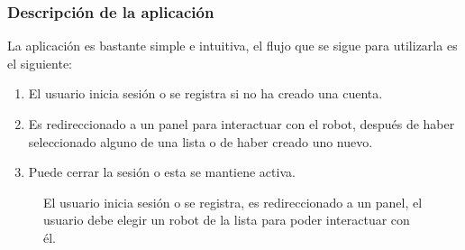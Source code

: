 %
%
%
%
%
%
%
%

\subsubsection{Descripción de la aplicación}
\label{\detokenize{descripcion-de-la-aplicacion}}

La aplicación es bastante simple e intuitiva, el flujo que se sigue para
utilizarla es el siguiente:
\begin{enumerate}
\item {} 
El usuario inicia sesión o se registra si no ha creado una cuenta.

\item {} 
Es redireccionado a un panel para interactuar con el robot, después de haber seleccionado alguno de una lista o de haber creado uno nuevo.

\item {} 
Puede cerrar la sesión o esta se mantiene activa.

\end{enumerate}

\begin{figure}[htbp]
\centering
\capstart

\noindent{}
\caption{El usuario inicia sesión o se registra, es redireccionado a un panel, el usuario debe elegir un robot de la lista para poder interactuar con él.}\label{\detokenize{users_docs:webappflow}}\end{figure}

